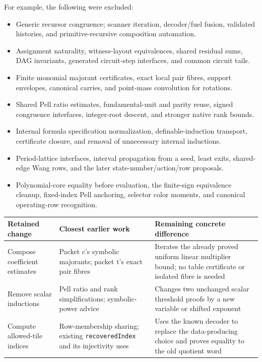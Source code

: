 \documentclass[11pt]{article}
\newcommand{\code}[1]{\ifmmode\text{\ttfamily\detokenize{#1}}\else\nolinkurl{#1}\fi}
\begin{document}
For example, the following were excluded:

\begin{itemize}
\item Generic recursor congruence; scanner iteration, decoder/fuel fusion, validated
  histories, and primitive-recursive composition automation.
\item Assignment naturality, witness-layout equivalences, shared residual sums,
  DAG invariants, generated circuit-step interfaces, and common circuit tails.
\item Finite monomial majorant certificates, exact local pair fibres, support
  envelopes, canonical carries, and point-mass convolution for rotations.
\item Shared Pell ratio estimates, fundamental-unit and parity reuse, signed
  congruence interfaces, integer-root descent, and stronger native rank bounds.
\item Internal formula specification normalization, definable-induction transport,
  certificate closure, and removal of unnecessary internal inductions.
\item Period-lattice interfaces, interval propagation from a seed, least exits,
  shared-edge Wang rows, and the later state-number/action/row proposals.
\item Polynomial-core equality before evaluation, the finite-sign equivalence cleanup,
  fixed-index Pell anchoring, selector color moments, and canonical operating-row recognition.
\end{itemize}

\begin{table}[ht]
\small
\begin{tabularx}{\textwidth}{@{}p{}YY@{}}
\toprule
Retained change & Closest earlier work & Remaining concrete difference\\
\midrule
Compose coefficient estimates &
Packet c's symbolic majorants; packet t's exact pair fibres &
Iterates the already proved uniform linear multiplier bound; no table certificate
or isolated fibre is needed\\
Remove scalar inductions &
Pell ratio and rank simplifications; symbolic-power advice &
Changes two unchanged scalar threshold proofs by a new variable or shifted exponent\\
Compute allowed-tile indices &
Row-membership sharing; existing \code{recoveredIndex} and its injectivity uses &
Uses the known decoder to replace the data-producing choice and proves equality
to the old quotient word\\
\bottomrule
\end{tabularx}
\end{table}
\end{document}
